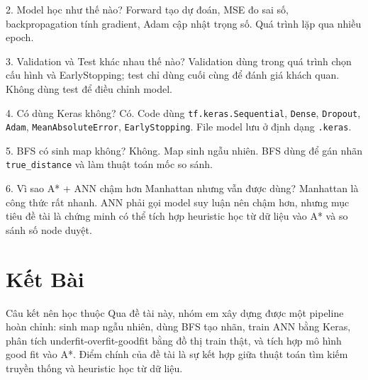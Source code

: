 \documentclass[12pt,a4paper]{article}
\newcommand{\code}[1]{\texttt{#1}}
\begin{document}
\begin{teachbox}{2. Model học như thế nào?}
Forward tạo dự đoán, MSE đo sai số, backpropagation tính gradient, Adam cập nhật trọng số. Quá trình lặp qua nhiều epoch.
\end{teachbox}

\begin{teachbox}{3. Validation và Test khác nhau thế nào?}
Validation dùng trong quá trình chọn cấu hình và EarlyStopping; test chỉ dùng cuối cùng để đánh giá khách quan. Không dùng test để điều chỉnh model.
\end{teachbox}

\begin{teachbox}{4. Có dùng Keras không?}
Có. Code dùng \code{tf.keras.Sequential}, \code{Dense}, \code{Dropout}, \code{Adam}, \code{MeanAbsoluteError}, \code{EarlyStopping}. File model lưu ở định dạng \code{.keras}.
\end{teachbox}

\begin{teachbox}{5. BFS có sinh map không?}
Không. Map sinh ngẫu nhiên. BFS dùng để gán nhãn \code{true\_distance} và làm thuật toán mốc so sánh.
\end{teachbox}

\begin{teachbox}{6. Vì sao A* + ANN chậm hơn Manhattan nhưng vẫn được dùng?}
Manhattan là công thức rất nhanh. ANN phải gọi model suy luận nên chậm hơn, nhưng mục tiêu đề tài là chứng minh có thể tích hợp heuristic học từ dữ liệu vào A* và so sánh số node duyệt.
\end{teachbox}

\section{Kết Bài}

\begin{saybox}{Câu kết nên học thuộc}
Qua đề tài này, nhóm em xây dựng được một pipeline hoàn chỉnh: sinh map ngẫu nhiên, dùng BFS tạo nhãn, train ANN bằng Keras, phân tích underfit-overfit-goodfit bằng đồ thị train thật, và tích hợp mô hình good fit vào A*. Điểm chính của đề tài là sự kết hợp giữa thuật toán tìm kiếm truyền thống và heuristic học từ dữ liệu.
\end{saybox}
\end{document}
